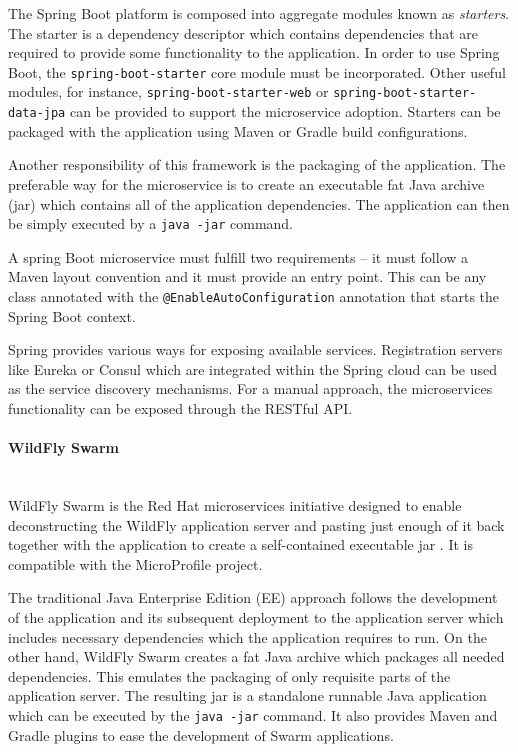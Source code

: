\documentclass[oneside,
  digital, %
  table,   %
  lof,     %
  lot,     %
]{fithesis3}
\newcommand{\newlinepar}[1]{\paragraph{#1}\needspace{3\baselineskip}\mbox{}\\}
\begin{document}
The Spring Boot platform is composed into aggregate modules known as \textit{starters}. The starter is a dependency descriptor which contains dependencies that are required to provide some functionality to the application. In order to use Spring Boot, the \texttt{spring-boot-starter} core module must be incorporated. Other useful modules, for instance, \texttt{spring-boot-starter-web} or \texttt{spring-boot-starter-data-jpa} can be provided to support the microservice adoption. Starters can be packaged with the application using Maven or Gradle build configurations.

Another responsibility of this framework is the packaging of the application. The preferable way for the microservice is to create an executable fat Java archive (jar) which contains all of the application dependencies. The application can then be simply executed by a \texttt{java -jar} command.

A spring Boot microservice must fulfill two requirements -- it must follow a Maven layout convention and it must provide an entry point. This can be any class annotated with the \texttt{@EnableAutoConfiguration} annotation that starts the Spring Boot context.

Spring provides various ways for exposing available services. Registration servers like Eureka or Consul which are integrated within the Spring cloud \cite{spring_cloud} can be used as the service discovery mechanisms. For a manual approach, the microservices functionality can be exposed through the RESTful API.

\newlinepar{WildFly Swarm}

WildFly Swarm is the Red Hat microservices initiative designed to enable deconstructing the WildFly application server and pasting just enough of it back together with the application to create a self-contained executable jar \cite{gupta_2018}. It is compatible with the MicroProfile project.

The traditional Java Enterprise Edition (EE) approach follows the development of the application and its subsequent deployment to the application server which includes necessary dependencies which the application requires to run. On the other hand, WildFly Swarm creates a fat Java archive which packages all needed dependencies. This emulates the packaging of only requisite parts of the application server. The resulting jar is a standalone runnable Java application which can be executed by the \texttt{java -jar} command. It also provides Maven and Gradle plugins to ease the development of Swarm applications.
\end{document}
